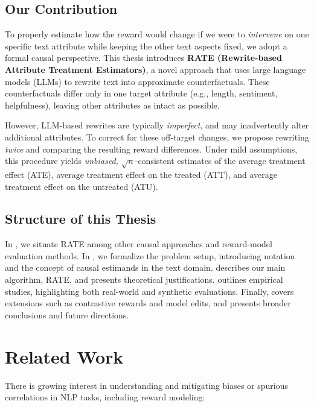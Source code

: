 \documentclass{article}
\theoremstyle{definition}
\begin{document}
\subsection{Our Contribution}
To properly estimate how the reward would change if we were to \emph{intervene} on one specific text attribute while keeping the other text aspects fixed, we adopt a formal causal perspective. This thesis introduces \textbf{RATE (Rewrite-based Attribute Treatment Estimators)}, a novel approach that uses large language models (LLMs) to rewrite text into approximate counterfactuals. These counterfactuals differ only in one target attribute (e.g., length, sentiment, helpfulness), leaving other attributes as intact as possible. 

However, LLM-based rewrites are typically \emph{imperfect}, and may inadvertently alter additional attributes. To correct for these off-target changes, we propose rewriting \emph{twice} and comparing the resulting reward differences. Under mild assumptions, this procedure yields \emph{unbiased,} $\sqrt{n}$-consistent estimates of the average treatment effect (ATE), average treatment effect on the treated (ATT), and average treatment effect on the untreated (ATU).

\subsection{Structure of this Thesis}
In , we situate RATE among other causal approaches and reward-model evaluation methods. In , we formalize the problem setup, introducing notation and the concept of causal estimands in the text domain.  describes our main algorithm, RATE, and  presents theoretical justifications.  outlines empirical studies, highlighting both real-world and synthetic evaluations. Finally,  covers extensions such as contrastive rewards and model edits, and  presents broader conclusions and future directions.

\section{Related Work}
\label{sec:related_work}

There is growing interest in understanding and mitigating biases or spurious correlations in NLP tasks, including reward modeling:
\end{document}
